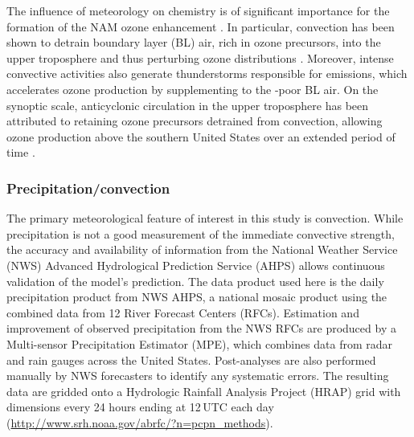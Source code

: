 The influence of meteorology on chemistry is of significant importance for the formation of the NAM
ozone enhancement \citep{Li:2005ss,Cooper:2007cr,Barth:2012qf}. In particular, convection has
been shown to detrain boundary layer (BL) air, rich in ozone precursors, into the upper troposphere and
thus perturbing ozone distributions \citep{Dickerson:1987hc,Kar:2004jl,Weinstock:2007yj}. Moreover,
intense convective activities also generate thunderstorms responsible for {\lnox} emissions, which
accelerates ozone production by supplementing to the -poor BL air. On the synoptic
scale, anticyclonic circulation in the upper troposphere has been attributed to retaining ozone
precursors detrained from convection, allowing ozone production above the southern United
States over an extended period of time \citep{Li:2005ss,Cooper:2007cr}.


\subsubsection{Precipitation/convection}

The primary meteorological feature of interest in this study is convection.
While precipitation is not a good measurement of the immediate convective strength, the
accuracy and availability of information from the National Weather Service (NWS) Advanced Hydrological
Prediction Service (AHPS) allows continuous validation of the model's prediction. The data product used here is the
daily precipitation product from NWS AHPS, a national mosaic product using the combined data from 12 River Forecast
Centers (RFCs). Estimation and improvement of observed precipitation from the NWS RFCs are produced by
a Multi-sensor Precipitation Estimator (MPE), which combines data from radar and rain gauges across
the United States. Post-analyses are also performed manually by NWS forecasters to identify any systematic
errors. The resulting data are gridded onto a Hydrologic Rainfall Analysis Project (HRAP) grid with dimensions
{} every 24 hours ending at 12\,\unit{UTC} each day
(\url{http://www.srh.noaa.gov/abrfc/?n=pcpn\_methods}).

